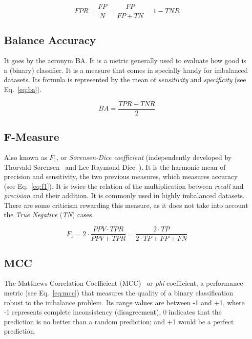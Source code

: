 \begin{equation}\label{eq:fpr}
    FPR = \frac{FP}{N} = \frac{FP}{FP + TN} = 1 - TNR
\end{equation}
    
\subsection{Balance Accuracy}

It goes by the acronym BA. It is a metric generally used to evaluate how
good is a (binary) classifier. It is a measure that comes in specially 
handy for imbalanced datasets. Its formula is represented by the mean of
\textit{sensitivity} and \textit{specificity} (see Eq.~\ref{eq:ba}).

\begin{equation}\label{eq:ba}
    BA = \frac{TPR + TNR}{2}
\end{equation}
    
\subsection{F-Measure} 
 
Also known as $F_1$, or \textit{S\o rensen-Dice coefficient} (independently
developed by Thorvald S\o rensen~\cite{sorensen1948} and Lee Raymond 
Dice~\cite{dice1945}). It is the harmonic mean of precision and sensitivity, 
the two previous measures, which measures accuracy (see Eq.~\ref{eq:f1}). It is 
twice the relation of the multiplication between \textit{recall} and 
\textit{precision} and their addition. It is commonly used in highly imbalanced 
datasets. There are some criticism rewarding this measure, as it does not take 
into account the \textit{True Negative} (\textit{TN}) cases.

\begin{equation}\label{eq:f1}
    F_1 = 2 \cdot \frac{PPV \cdot TPR}{PPV + TPR} = \frac{2 \cdot TP}{2 \cdot TP + FP + FN}
\end{equation}
    
\subsection{MCC} 

The Matthews Correlation Coefficient (MCC)~\cite{Matthews1975} or \textit{phi} 
coefficient, a performance metric (see Eq.~\ref{eq:mcc}) that measures the 
quality of a binary classification robust to the imbalance problem. Its range 
values are  between -1 and +1, where -1 represents complete inconsistency 
(disagreement), 0 indicates that the prediction is no better than a random 
prediction; and +1 would be a perfect prediction.  

